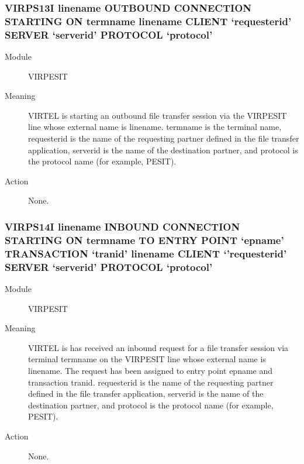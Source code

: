 \documentclass[letterpaper,10pt,english]{sphinxmanual}
\begin{document}
\subsubsection{VIRPS13I linename OUTBOUND CONNECTION STARTING ON termname \textbar{} linename CLIENT ‘requesterid’ SERVER ‘serverid’ PROTOCOL ‘protocol’}
\label{\detokenize{messages:virps13i-linename-outbound-connection-starting-on-termname-linename-client-requesterid-server-serverid-protocol-protocol}}\begin{description}
\item[{Module}] \leavevmode
VIRPESIT

\item[{Meaning}] \leavevmode
VIRTEL is starting an outbound file transfer session via the VIRPESIT line whose external name is linename. termname is the terminal name, requesterid is the name of the requesting partner defined in the file transfer application, serverid is the name of the destination partner, and protocol is the protocol name (for example, PESIT).

\item[{Action}] \leavevmode
None.

\end{description}


\subsubsection{VIRPS14I linename INBOUND CONNECTION STARTING ON termname TO ENTRY POINT ‘epname’ TRANSACTION ‘tranid’ \textbar{} linename CLIENT ‘’requesterid’ SERVER ‘serverid’ PROTOCOL ‘protocol’}
\label{\detokenize{messages:virps14i-linename-inbound-connection-starting-on-termname-to-entry-point-epname-transaction-tranid-linename-client-requesterid-server-serverid-protocol-protocol}}\begin{description}
\item[{Module}] \leavevmode
VIRPESIT

\item[{Meaning}] \leavevmode
VIRTEL is has received an inbound request for a file transfer session via terminal termname on the VIRPESIT line whose external name is linename. The request has been assigned to entry point epname and transaction tranid. requesterid is the name of the requesting partner defined in the file transfer application, serverid is the name of the destination partner, and protocol is the protocol name (for example, PESIT).

\item[{Action}] \leavevmode
None.

\end{description}
\end{document}
